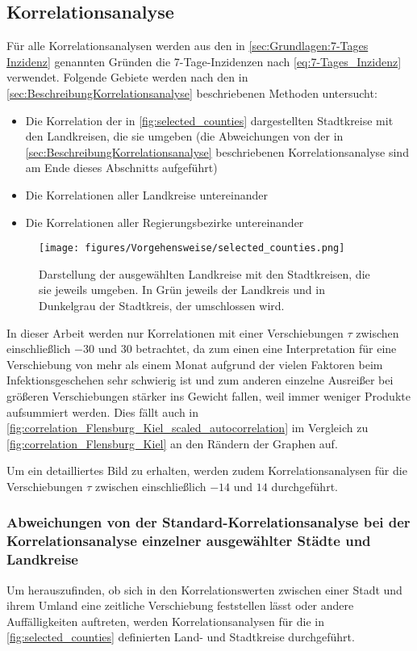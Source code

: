 \subsection{Korrelationsanalyse}\label{sec:Vorgehensweise:Korrelationsanalyse}
Für alle Korrelationsanalysen werden aus den in \autoref{sec:Grundlagen:7-Tages Inzidenz} genannten Gründen die 7-Tage-Inzidenzen nach \autoref{eq:7-Tages_Inzidenz} verwendet. Folgende Gebiete werden nach den in \autoref{sec:BeschreibungKorrelationsanalyse} beschriebenen Methoden untersucht:
\begin{itemize}
    \item Die Korrelation der in \autoref{fig:selected_counties} dargestellten Stadtkreise mit den Landkreisen, die sie umgeben (die Abweichungen von der in \autoref{sec:BeschreibungKorrelationsanalyse} beschriebenen Korrelationsanalyse sind am Ende dieses Abschnitts aufgeführt)
    \item Die Korrelationen aller Landkreise untereinander
    \item Die Korrelationen aller Regierungsbezirke untereinander
\end{itemize}

\begin{figure}[H]
    \centering
    \texttt{[image: figures/Vorgehensweise/selected\_counties.png]}
    \caption{Darstellung der ausgewählten Landkreise mit den Stadtkreisen, die sie jeweils umgeben. In Grün jeweils der Landkreis und in Dunkelgrau der Stadtkreis, der umschlossen wird.}
    \label{fig:selected_counties}
\end{figure}
In dieser Arbeit werden nur Korrelationen mit einer Verschiebungen $\tau$ zwischen einschließlich $-30$ und $30$ betrachtet, da zum einen eine Interpretation für eine Verschiebung von mehr als einem Monat aufgrund der vielen Faktoren beim Infektionsgeschehen sehr schwierig ist und zum anderen einzelne Ausreißer bei größeren Verschiebungen stärker ins Gewicht fallen, weil immer weniger Produkte aufsummiert werden. Dies fällt auch in \autoref{fig:correlation_Flensburg_Kiel_scaled_autocorrelation} im Vergleich zu \autoref{fig:correlation_Flensburg_Kiel} an den Rändern der Graphen auf.

Um ein detailliertes Bild zu erhalten, werden zudem Korrelationsanalysen für die Verschiebungen $\tau$ zwischen einschließlich $-14$ und $14$ durchgeführt.

\subsubsection{Abweichungen von der Standard-Korrelationsanalyse bei der Korrelationsanalyse einzelner ausgewählter Städte und Landkreise}\label{sec:selected_counties}
Um herauszufinden, ob sich in den Korrelationswerten zwischen einer Stadt und ihrem Umland eine zeitliche Verschiebung feststellen lässt oder andere Auffälligkeiten auftreten, werden Korrelationsanalysen für die in \autoref{fig:selected_counties} definierten Land- und Stadtkreise durchgeführt.

